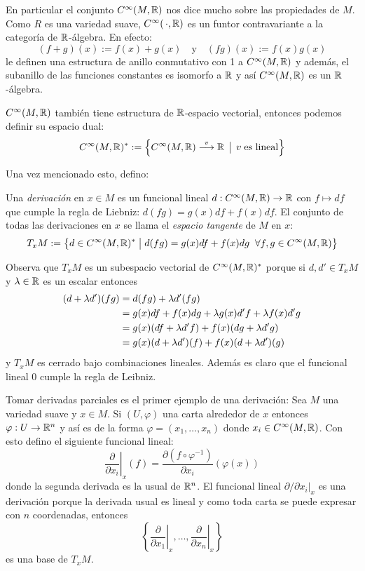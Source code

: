 \documentclass[../../topologia_algebraica]{subfiles}
\begin{document}
En particular el conjunto $C^{\infty}(M,\mathbb{R})$ nos dice mucho sobre las propiedades de $M$. Como
$R$ es una variedad suave, $C^{\infty}(\,\cdot,\mathbb{R})$ es un funtor contravariante a la categor\'ia
de $\mathbb{R}$-\'algebra. En efecto:
\[
  (f+g)(x):=f(x)+g(x) \quad\text{y}\quad (fg)(x):=f(x)g(x)
\]
le definen una estructura de anillo conmutativo con 1 a $C^{\infty}(M,\mathbb{R})$ y adem\'as, el subanillo
de las funciones constantes es isomorfo a $\mathbb{R}$ y as\'i $C^{\infty}(M,\mathbb{R})$ es un $\mathbb{R}$-\'algebra.

$C^{\infty}(M,\mathbb{R})$ tambi\'en tiene estructura de $\mathbb{R}$-espacio vectorial, entonces podemos
definir su espacio dual:
\[
  C^{\infty}(M,\mathbb{R})^*:=\Big\{ C^{\infty}(M,\mathbb{R}) \overset{v}{\longrightarrow} \mathbb{R} \;\,\big|\;\, v\;\text{es lineal} \Big\}
\]


Una vez mencionado esto, defino:

\begin{defin}
  Una \emph{derivaci\'on} en $x\in M$ es un funcional lineal $d:C^{\infty}(M,\mathbb{R})\rightarrow\mathbb{R}$ con
  $f\mapsto df$ que cumple la regla de Liebniz: $d(fg)=g(x)df+f(x)df$. El conjunto de todas
  las derivaciones en $x$ se llama el \emph{espacio tangente} de $M$ en $x$:
  \[
    T_x M:=
    \big\{d\in C^{\infty}(M,\mathbb{R})^*\;\big|\;
    d(fg)=g(x)df+f(x)dg \;\;\forall f,g\in C^{\infty}(M,\mathbb{R})\big\}
  \]
\end{defin}

Observa que $T_x M$ es un subespacio vectorial de $C^{\infty}(M,\mathbb{R})^*$ porque si $d,d'\in T_x M$
y $\lambda\in\mathbb{R}$ es un escalar entonces
\begin{align*}
  (d+\lambda d')(fg)& =
  d(fg)+\lambda d'(fg) \\ & =
  g(x)df+f(x)dg+\lambda g(x)d'f+\lambda f(x)d'g \\ & =
  g(x)(df+\lambda d'f)+f(x)(dg+\lambda d'g)\\ & =
  g(x)(d+\lambda d')(f)+f(x)(d+\lambda d')(g)
\end{align*}
y $T_x M$ es cerrado bajo combinaciones lineales. Adem\'as es claro que el funcional lineal $0$
cumple la regla de Leibniz.

Tomar derivadas parciales es el primer ejemplo de una derivaci\'on: Sea $M$ una variedad suave y
$x\in M$. Si $(U,\varphi)$ una carta alrededor de $x$ entonces $\varphi:U\rightarrow\mathbb{R}^n$ y as\'i es de la
forma $\varphi=(x_1,\ldots,x_n)$ donde $x_i\in C^{\infty}(M,\mathbb{R})$. Con esto defino el siguiente
funcional lineal:
\[
  \left. \frac{\partial}{\partial x_i} \right|_{x}(f)=
  \frac{\partial(f\circ \varphi^{-1})}{\partial x_i}(\varphi(x))
\]
donde la segunda derivada es la usual de $\mathbb{R}^n$. El funcional lineal $\partial/\partial x_i|_x$
es una derivaci\'on porque la derivada usual es lineal y como toda carta se puede expresar con
$n$ coordenadas, entonces
\[
  \left\{ \left. \frac{\partial}{\partial x_1} \right|_{x},\ldots,
  \left. \frac{\partial}{\partial x_n} \right|_{x}\right\}
\]
es una base de $T_x M$.
\end{document}

